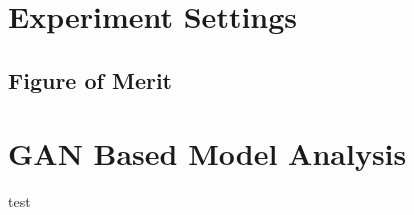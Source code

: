 
\begingroup

\section{Experiment Settings}

\subsection{Figure of Merit}
\section{GAN Based Model Analysis}

\begin{table}[]
	\centering
	\caption{Ablation study for AnoGAN to test the effect of various training improvements for stabilization.}
	\label{tab:anogan_ablation}
\end{table}
 test
